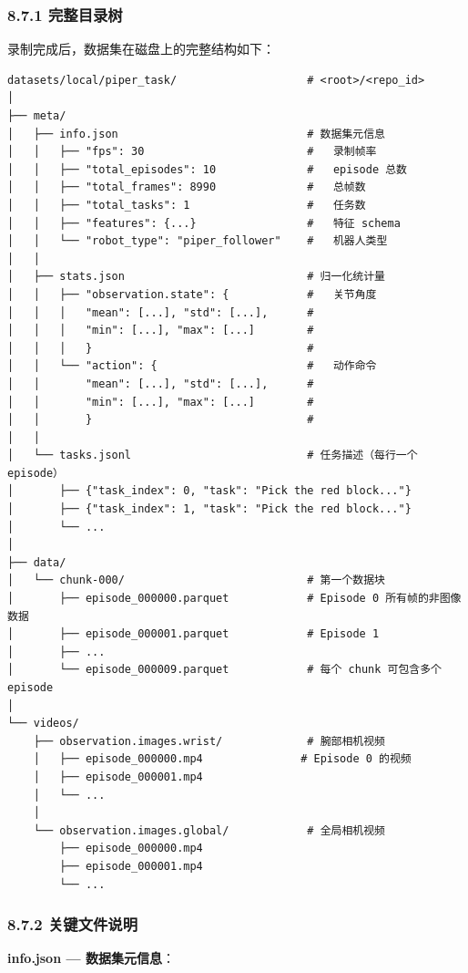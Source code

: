 \documentclass[UTF8,a4paper,11pt]{ctexart}
\begin{document}
{\subsubsection{8.7.1 完整目录树}

录制完成后，数据集在磁盘上的完整结构如下：

\begin{lstlisting}[language=text]
datasets/local/piper_task/                    # <root>/<repo_id>
│
├── meta/
│   ├── info.json                             # 数据集元信息
│   │   ├── "fps": 30                         #   录制帧率
│   │   ├── "total_episodes": 10              #   episode 总数
│   │   ├── "total_frames": 8990              #   总帧数
│   │   ├── "total_tasks": 1                  #   任务数
│   │   ├── "features": {...}                 #   特征 schema
│   │   └── "robot_type": "piper_follower"    #   机器人类型
│   │
│   ├── stats.json                            # 归一化统计量
│   │   ├── "observation.state": {            #   关节角度
│   │   │   "mean": [...], "std": [...],      #
│   │   │   "min": [...], "max": [...]        #
│   │   │   }                                 #
│   │   └── "action": {                       #   动作命令
│   │       "mean": [...], "std": [...],      #
│   │       "min": [...], "max": [...]        #
│   │       }                                 #
│   │
│   └── tasks.jsonl                           # 任务描述（每行一个 episode）
│       ├── {"task_index": 0, "task": "Pick the red block..."}
│       ├── {"task_index": 1, "task": "Pick the red block..."}
│       └── ...
│
├── data/
│   └── chunk-000/                            # 第一个数据块
│       ├── episode_000000.parquet            # Episode 0 所有帧的非图像数据
│       ├── episode_000001.parquet            # Episode 1
│       ├── ...
│       └── episode_000009.parquet            # 每个 chunk 可包含多个 episode
│
└── videos/
    ├── observation.images.wrist/             # 腕部相机视频
    │   ├── episode_000000.mp4               # Episode 0 的视频
    │   ├── episode_000001.mp4
    │   └── ...
    │
    └── observation.images.global/            # 全局相机视频
        ├── episode_000000.mp4
        ├── episode_000001.mp4
        └── ...
\end{lstlisting}

\subsubsection{8.7.2 关键文件说明}

\textbf{info.json — 数据集元信息}：

}
\end{document}
